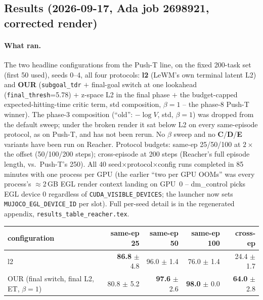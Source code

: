 \documentclass[11pt]{article}
\begin{document}
\subsection{Results (2026-09-17, Ada job 2698921, corrected render)}
\paragraph{What ran.} The two headline configurations from the Push-T line, on the fixed
200-task set (first 50 used), seeds 0--4, all four protocols: \textbf{l2} (LeWM's own terminal
latent L2) and \textbf{OUR} (\texttt{subgoal\_tdr} $+$ final-goal switch at one lookahead
(\texttt{final\_thresh}=5.78) $+$ z-space L2 in the final phase $+$ the budget-capped
expected-hitting-time critic term, std composition, $\beta=1$ -- the phase-8 Push-T winner).
The phase-3 composition (``old'': $-\log V$, std, $\beta=1$) was dropped from the default sweep;
under the broken render it sat below L2 on every same-episode protocol, as on Push-T, and has
not been rerun. No $\beta$ sweep and no \textbf{C}/\textbf{D}/\textbf{E} variants have been run
on Reacher. Protocol budgets: same-ep 25/50/100 at $2\times$ the offset (50/100/200 steps);
cross-episode at 200 steps (Reacher's full episode length, vs.\ Push-T's 250). All 40
seed$\times$protocol$\times$config runs completed in 85 minutes with one process per GPU
(the earlier ``two per GPU OOMs'' was every process's $\approx$2\,GB EGL render context landing
on GPU~0 -- dm\_control picks EGL device 0 regardless of \texttt{CUDA\_VISIBLE\_DEVICES}; the
launcher now sets \texttt{MUJOCO\_EGL\_DEVICE\_ID} per slot). Full per-seed detail is in the
regenerated appendix, \texttt{results\_table\_reacher.tex}.

\begin{center}\small
\begin{tabular}{lrrrr}
\toprule
configuration & same-ep 25 & same-ep 50 & same-ep 100 & cross-ep \\
\midrule
l2 & \textbf{86.8} $\pm$ 4.8 & 96.0 $\pm$ 1.4 & 76.0 $\pm$ 1.4 & 24.4 $\pm$ 1.7 \\
OUR (final switch, final L2, ET, $\beta=1$) & 80.8 $\pm$ 5.2 & \textbf{97.6} $\pm$ 2.6 & \textbf{98.0} $\pm$ 0.0 & \textbf{64.0} $\pm$ 2.8 \\
\bottomrule
\end{tabular}
\end{center}
\end{document}
